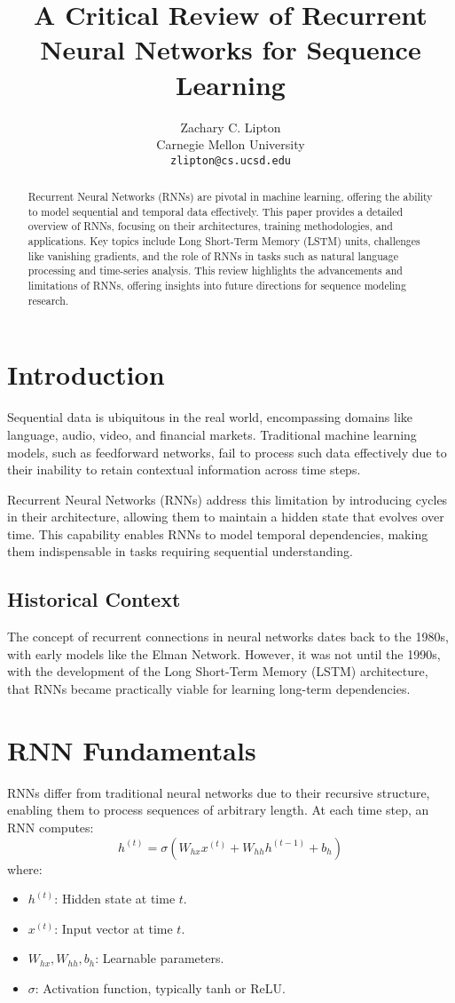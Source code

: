 \documentclass[12pt]{article}
\title{A Critical Review of Recurrent Neural Networks for Sequence Learning}
\author{Zachary C. Lipton \\ Carnegie Mellon University \\ \texttt{zlipton@cs.ucsd.edu}}
\date{}
\begin{document}
\maketitle

\begin{abstract}
Recurrent Neural Networks (RNNs) are pivotal in machine learning, offering the ability to model sequential and temporal data effectively. This paper provides a detailed overview of RNNs, focusing on their architectures, training methodologies, and applications. Key topics include Long Short-Term Memory (LSTM) units, challenges like vanishing gradients, and the role of RNNs in tasks such as natural language processing and time-series analysis. This review highlights the advancements and limitations of RNNs, offering insights into future directions for sequence modeling research.
\end{abstract}


\section{Introduction}
Sequential data is ubiquitous in the real world, encompassing domains like language, audio, video, and financial markets. Traditional machine learning models, such as feedforward networks, fail to process such data effectively due to their inability to retain contextual information across time steps.

Recurrent Neural Networks (RNNs) address this limitation by introducing cycles in their architecture, allowing them to maintain a hidden state that evolves over time. This capability enables RNNs to model temporal dependencies, making them indispensable in tasks requiring sequential understanding.

\subsection{Historical Context}
The concept of recurrent connections in neural networks dates back to the 1980s, with early models like the Elman Network. However, it was not until the 1990s, with the development of the Long Short-Term Memory (LSTM) architecture, that RNNs became practically viable for learning long-term dependencies.

\section{RNN Fundamentals}
RNNs differ from traditional neural networks due to their recursive structure, enabling them to process sequences of arbitrary length. At each time step, an RNN computes:
\[
h^{(t)} = \sigma(W_{hx}x^{(t)} + W_{hh}h^{(t-1)} + b_h)
\]
where:
\begin{itemize}
    \item \( h^{(t)} \): Hidden state at time \( t \).
    \item \( x^{(t)} \): Input vector at time \( t \).
    \item \( W_{hx}, W_{hh}, b_h \): Learnable parameters.
    \item \( \sigma \): Activation function, typically tanh or ReLU.
\end{itemize}
\end{document}
